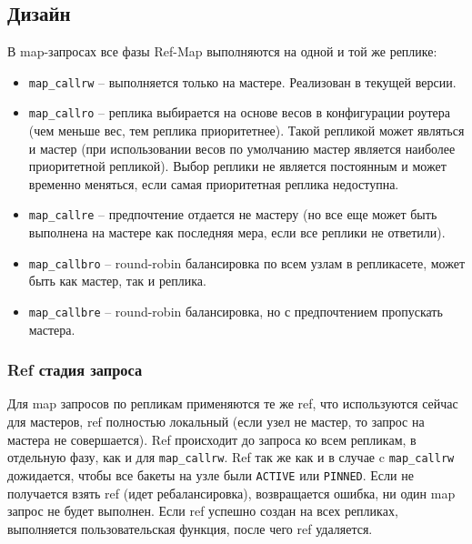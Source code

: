 \subsection{Дизайн}

В map-запросах все фазы Ref-Map выполняются на одной и той же реплике:

\begin{itemize}
\item \texttt{map\_callrw} -- выполняется только на мастере. Реализован в
    текущей версии.

\item \texttt{map\_callro} -- реплика выбирается на основе весов в конфигурации
    роутера (чем меньше вес, тем реплика приоритетнее). Такой репликой может
        являться и мастер (при использовании весов по умолчанию мастер является
        наиболее приоритетной репликой). Выбор реплики не является постоянным и
        может временно меняться, если самая приоритетная реплика недоступна.

\item \texttt{map\_callre} -- предпочтение отдается не мастеру (но все еще
    может быть выполнена на мастере как последняя мера, если все реплики не
        ответили).

\item \texttt{map\_callbro} -- round-robin балансировка по всем узлам в
    репликасете, может быть как мастер, так и реплика.

\item \texttt{map\_callbre} -- round-robin балансировка, но с предпочтением
    пропускать мастера.
\end{itemize}

\subsubsection{Ref стадия запроса}

Для map запросов по репликам применяются те же ref, что используются сейчас
для мастеров, ref полностью локальный (если узел не мастер, то запрос на
мастера не совершается). Ref происходит до запроса ко всем репликам, в
отдельную фазу, как и для \texttt{map\_callrw}. Ref так же как и в случае c
\texttt{map\_callrw} дожидается, чтобы все бакеты на узле были
\texttt{ACTIVE} или \texttt{PINNED}. Если не получается взять ref (идет
ребалансировка), возвращается ошибка, ни один map запрос не будет выполнен.
Если ref успешно создан на всех репликах, выполняется пользовательская функция,
после чего ref удаляется.

